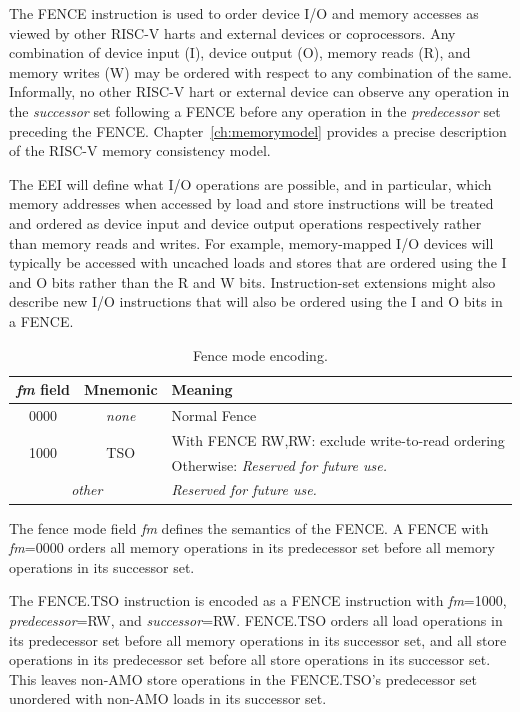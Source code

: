 The FENCE instruction is used to order device I/O and
memory accesses as viewed by other RISC-V harts and external devices
or coprocessors.  Any combination of device input (I), device output
(O), memory reads (R), and memory writes (W) may be ordered with
respect to any combination of the same.  Informally, no other RISC-V
hart or external device can observe any operation in the {\em
  successor} set following a FENCE before any operation in the {\em
  predecessor} set preceding the FENCE.
Chapter~\ref{ch:memorymodel} provides a precise description of the
RISC-V memory consistency model.
  
The EEI will define what I/O operations are possible, and in
particular, which memory addresses when accessed by load and store instructions will be treated and
ordered as device input and device output operations respectively
rather than memory reads and writes.  For example, memory-mapped I/O
devices will typically be accessed with uncached loads and stores that
are ordered using the I and O bits rather than the R and W bits.
Instruction-set extensions might also describe new I/O
instructions that will also be ordered using the I and O bits in a
FENCE.

\begin{table}[htp]
\begin{small}
\begin{center}
\begin{tabular}{|c|c|l|}
\hline
{\em fm} field & Mnemonic & Meaning \\
\hline
0000 & \em none & Normal Fence \\
\hline
\multirow{2}{*}{1000} & \multirow{2}{*}{TSO} & With FENCE RW,RW: exclude write-to-read ordering \\
                      &                      & Otherwise: \em Reserved for future use. \\
\hline
\multicolumn{2}{|c|}{\em other} & \em Reserved for future use. \\
\hline
\end{tabular}
\end{center}
\end{small}
\caption{Fence mode encoding.}
\label{fm}
\end{table}

The fence mode field {\em fm} defines the semantics of the FENCE.  A
FENCE with {\em fm}=0000 orders all memory operations in its
predecessor set before all memory operations in its successor set. 

The FENCE.TSO instruction is encoded as a FENCE instruction
with {\em fm}=1000, {\em predecessor}=RW, and {\em successor}=RW.
FENCE.TSO orders all load
operations in its predecessor set before all memory operations in its
successor set, and all store operations in its predecessor set before
all store operations in its successor set.  This leaves non-AMO store
operations in the FENCE.TSO's predecessor set unordered with non-AMO
loads in its successor set.

